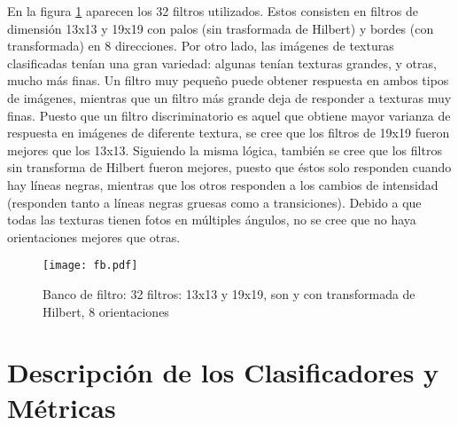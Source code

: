 \documentclass[10pt,twocolumn,letterpaper]{article}
\begin{document}
En la figura \ref{fig:fb} aparecen los 32 filtros utilizados. Estos consisten en filtros de dimensión 13x13 y 19x19 con palos (sin trasformada de Hilbert) y bordes (con transformada) en 8 direcciones. Por otro lado, las imágenes de texturas clasificadas tenían una gran variedad: algunas tenían texturas grandes, y otras, mucho más finas. Un filtro muy pequeño puede obtener respuesta en ambos tipos de imágenes, mientras que un filtro más grande deja de responder a texturas muy finas. Puesto que un filtro discriminatorio es aquel que obtiene mayor varianza de respuesta en imágenes de diferente textura, se cree que los filtros de 19x19 fueron mejores que los 13x13. Siguiendo la misma lógica, también se cree que los filtros sin transforma de Hilbert fueron mejores, puesto que éstos solo responden cuando hay líneas negras, mientras que los otros responden a los cambios de intensidad (responden tanto a líneas negras gruesas como a transiciones). Debido a que todas las texturas tienen fotos en múltiples ángulos, no se cree que no haya orientaciones mejores que otras.

\begin{figure}[t]
\begin{center}
   \texttt{[image: fb.pdf]}
\end{center}
   \caption{Banco de filtro: 32 filtros: 13x13 y 19x19, son y con transformada de Hilbert, 8 orientaciones}
\label{fig:fb}
\end{figure}


\section{Descripción de los Clasificadores y Métricas}
\end{document}
